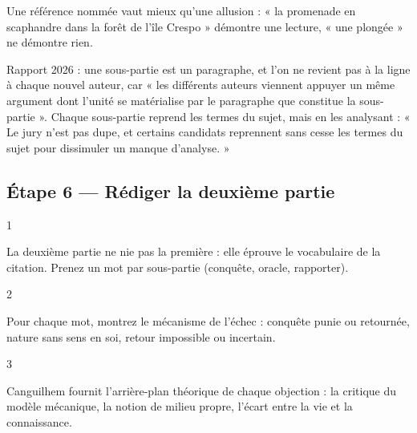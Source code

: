 \documentclass[11pt,a4paper]{article}
\begin{document}
\begin{methode}

Une référence nommée vaut mieux qu'une allusion : « la promenade en scaphandre dans la forêt de l'île Crespo » démontre une lecture, « une plongée » ne démontre rien.

\end{methode}

\begin{jury}

Rapport 2026 : une sous-partie est un paragraphe, et l'on ne revient pas à la ligne à chaque nouvel auteur, car « les différents auteurs viennent appuyer un même argument dont l'unité se matérialise par le paragraphe que constitue la sous-partie ». Chaque sous-partie reprend les termes du sujet, mais en les analysant : « Le jury n'est pas dupe, et certains candidats reprennent sans cesse les termes du sujet pour dissimuler un manque d'analyse. »

\end{jury}

\hypertarget{uxe9tape-6-ruxe9diger-la-deuxiuxe8me-partie}{%
\subsection{Étape 6 --- Rédiger la deuxième partie}\label{uxe9tape-6-ruxe9diger-la-deuxiuxe8me-partie}}

\begin{indication}{1}

La deuxième partie ne nie pas la première : elle éprouve le vocabulaire de la citation. Prenez un mot par sous-partie (conquête, oracle, rapporter).

\end{indication}

\begin{indication}{2}

Pour chaque mot, montrez le mécanisme de l'échec : conquête punie ou retournée, nature sans sens en soi, retour impossible ou incertain.

\end{indication}

\begin{indication}{3}

Canguilhem fournit l'arrière-plan théorique de chaque objection : la critique du modèle mécanique, la notion de milieu propre, l'écart entre la vie et la connaissance.

\end{indication}
\end{document}
